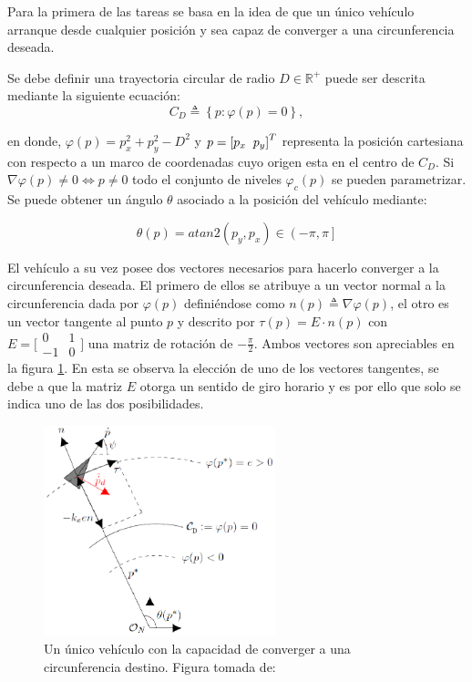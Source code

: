 Para la primera de las tareas se basa en la idea de que un único vehículo arranque desde cualquier posición y sea capaz de converger a una circunferencia deseada.

Se debe definir una trayectoria circular de radio $D\in\mathbb{R}^+$ puede ser descrita mediante la siguiente ecuación:
\begin{equation}	
	C_D\triangleq\left\lbrace{p:\varphi{\left(p\right)}=0}\right\rbrace{,}
\end{equation}

en donde, $\varphi\left(p\right)=p_{x}^{2}+p_{y}^{2}-D^{2}$ y $p=\left[p_x\hspace{2mm}p_y\right]^T$ representa la posición cartesiana con respecto a un marco de coordenadas cuyo origen esta en el centro de $C_D$. Si $\nabla{\varphi\left(p\right)}\neq{0}\Longleftrightarrow{p}\neq{0}$ todo el conjunto de niveles $\varphi_c\left(p\right)$ se pueden parametrizar. Se puede obtener un ángulo $\theta$ asociado a la posición del vehículo mediante:

\begin{equation} \label{Angulo_Teta}
	\theta\left(p\right)=atan2\left(p_{y},p_{x}\right)\in\left(-\pi,\pi\right]
\end{equation} 

El vehículo a su vez posee dos vectores necesarios para hacerlo converger a la circunferencia deseada. El primero de ellos se atribuye a un vector normal a la circunferencia dada por $\varphi\left(p\right)$ definiéndose como $n\left(p\right)\triangleq\nabla\varphi\left(p\right)$, el otro es un vector tangente al punto $p$ y descrito por $\tau\left(p\right)=E\cdot{n\left(p\right)}$ con $E = \bigl[\begin{smallmatrix}0 & 1\\ -1 & 0\end{smallmatrix}\bigr]$ una matriz de rotación de $-\frac{\pi}{2}$. Ambos vectores son apreciables en la figura \ref{Primera_Acción_Control}. En esta se observa la elección de uno de los vectores tangentes, se debe a que la matriz $E$ otorga un sentido de giro horario y es por ello que solo se indica uno de las dos posibilidades.

\newpage
\begin{figure}[htb]
\centering
\includegraphics[width=0.60\textwidth]{figures/Coord_1.eps}
\caption{Un único vehículo con la capacidad de converger a una circunferencia destino. Figura tomada de: \cite{Control_Formacion}} \label{Primera_Acción_Control}
\end{figure}

